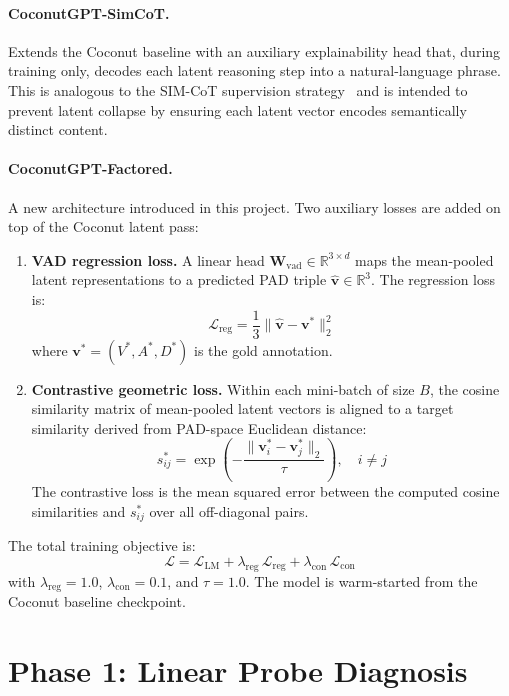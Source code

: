 \paragraph{CoconutGPT-SimCoT.}
Extends the Coconut baseline with an auxiliary explainability head that, during training only, decodes each latent reasoning step into a natural-language phrase.
This is analogous to the SIM-CoT supervision strategy~\cite{wei2025simcot} and is intended to prevent latent collapse by ensuring each latent vector encodes semantically distinct content.

\paragraph{CoconutGPT-Factored.}
A new architecture introduced in this project.
Two auxiliary losses are added on top of the Coconut latent pass:
\begin{enumerate}
    \item \textbf{VAD regression loss.} A linear head $\mathbf{W}_{\text{vad}} \in \mathbb{R}^{3 \times d}$ maps the mean-pooled latent representations to a predicted PAD triple $\hat{\mathbf{v}} \in \mathbb{R}^3$.
    The regression loss is:
    \[
        \mathcal{L}_{\text{reg}} = \frac{1}{3} \|\hat{\mathbf{v}} - \mathbf{v}^*\|_2^2
    \]
    where $\mathbf{v}^* = (V^*, A^*, D^*)$ is the gold annotation.

    \item \textbf{Contrastive geometric loss.} Within each mini-batch of size $B$, the cosine similarity matrix of mean-pooled latent vectors is aligned to a target similarity derived from PAD-space Euclidean distance:
    \[
        s_{ij}^* = \exp\!\left(-\frac{\|\mathbf{v}_i^* - \mathbf{v}_j^*\|_2}{\tau}\right), \quad i \neq j
    \]
    The contrastive loss is the mean squared error between the computed cosine similarities and $s_{ij}^*$ over all off-diagonal pairs.
\end{enumerate}

The total training objective is:
\[
    \mathcal{L} = \mathcal{L}_{\text{LM}} + \lambda_{\text{reg}}\,\mathcal{L}_{\text{reg}} + \lambda_{\text{con}}\,\mathcal{L}_{\text{con}}
\]
with $\lambda_{\text{reg}} = 1.0$, $\lambda_{\text{con}} = 0.1$, and $\tau = 1.0$.
The model is warm-started from the Coconut baseline checkpoint.

\section{Phase 1: Linear Probe Diagnosis}

